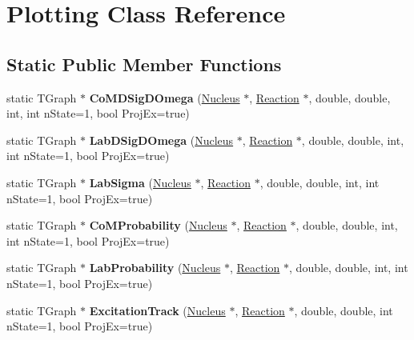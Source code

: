 \hypertarget{classPlotting}{\section{Plotting Class Reference}
\label{classPlotting}
}
\subsection*{Static Public Member Functions}
\begin{DoxyCompactItemize}
\item 
\hypertarget{classPlotting_a7ba1f8e17589c29158908722127db4b2}{static T\-Graph $\ast$ {\bfseries Co\-M\-D\-Sig\-D\-Omega} (\hyperlink{classNucleus}{Nucleus} $\ast$, \hyperlink{classReaction}{Reaction} $\ast$, double, double, int, int n\-State=1, bool Proj\-Ex=true)}\label{classPlotting_a7ba1f8e17589c29158908722127db4b2}

\item 
\hypertarget{classPlotting_aec85a236379d09d6e6c00f8945faf0cb}{static T\-Graph $\ast$ {\bfseries Lab\-D\-Sig\-D\-Omega} (\hyperlink{classNucleus}{Nucleus} $\ast$, \hyperlink{classReaction}{Reaction} $\ast$, double, double, int, int n\-State=1, bool Proj\-Ex=true)}\label{classPlotting_aec85a236379d09d6e6c00f8945faf0cb}

\item 
\hypertarget{classPlotting_afd3c8e6c3a6e00d181e738047be7161a}{static T\-Graph $\ast$ {\bfseries Lab\-Sigma} (\hyperlink{classNucleus}{Nucleus} $\ast$, \hyperlink{classReaction}{Reaction} $\ast$, double, double, int, int n\-State=1, bool Proj\-Ex=true)}\label{classPlotting_afd3c8e6c3a6e00d181e738047be7161a}

\item 
\hypertarget{classPlotting_ae9766fb9575c6a914f1984440f829587}{static T\-Graph $\ast$ {\bfseries Co\-M\-Probability} (\hyperlink{classNucleus}{Nucleus} $\ast$, \hyperlink{classReaction}{Reaction} $\ast$, double, double, int, int n\-State=1, bool Proj\-Ex=true)}\label{classPlotting_ae9766fb9575c6a914f1984440f829587}

\item 
\hypertarget{classPlotting_a7f81dd921364ea2e0f0552f1ed45bfc1}{static T\-Graph $\ast$ {\bfseries Lab\-Probability} (\hyperlink{classNucleus}{Nucleus} $\ast$, \hyperlink{classReaction}{Reaction} $\ast$, double, double, int, int n\-State=1, bool Proj\-Ex=true)}\label{classPlotting_a7f81dd921364ea2e0f0552f1ed45bfc1}

\item 
\hypertarget{classPlotting_ab42f057b4c409a9066e21ff8aac1275f}{static T\-Graph $\ast$ {\bfseries Excitation\-Track} (\hyperlink{classNucleus}{Nucleus} $\ast$, \hyperlink{classReaction}{Reaction} $\ast$, double, double, int n\-State=1, bool Proj\-Ex=true)}\label{classPlotting_ab42f057b4c409a9066e21ff8aac1275f}


\end{DoxyCompactItemize}
